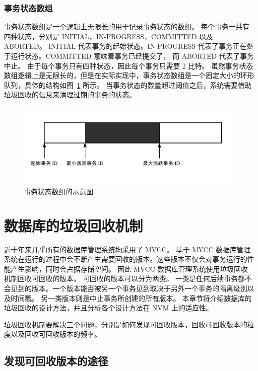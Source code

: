 \subsubsection{事务状态数组}

事务状态数组是一个逻辑上无限长的用于记录事务状态的数组。
每个事务一共有四种状态，分别是 INITIAL，IN-PROGRESS，COMMITTED 以及 ABORTED。
INITIAL 代表事务的起始状态。IN-PROGRESS 代表了事务正在处于运行状态。COMMITTED 意味着事务已经提交了，
而 ABORTED 代表了事务中止。
由于每个事务只有四种状态，因此每个事务只需要 2 比特。
虽然事务状态数组逻辑上是无限长的，但是在实际实现中，事务状态数组是一个固定大小的环形队列，具体的结构如图~\ref{fig:clog} 所示。
当事务状态的数量超过阈值之后，系统需要借助垃圾回收的信息来清理过期的事务的状态。

\begin{figure}
    \centering
    \includegraphics[width=1\linewidth]{figures/clog.pdf}
    \caption{事务状态数组的示意图}
    \label{fig:clog}
\end{figure}




\section{数据库的垃圾回收机制}

近十年来几乎所有的数据库管理系统均采用了 MVCC。
基于 MVCC 数据库管理系统在运行的过程中会不断产生需要回收的版本。这些版本不仅会对事务运行的性能产生影响，同时会占据存储空间。
因此 MVCC 数据库管理系统使用垃圾回收机制回收可回收的版本。
可回收的版本可以分为两类。
一类是任何后续事务都不会见到的版本。一个版本能否被另一个事务见到取决于另外一个事务的隔离级别以及时间戳。
另一类版本则是中止事务所创建的所有版本。
本章节将介绍数据库的垃圾回收的设计方法，并且分析各个设计方法在 NVM 上的适应性。

垃圾回收机制要解决三个问题，分别是如何发现可回收版本，回收可回收版本的粒度以及回收可回收版本的频率。

\subsection{发现可回收版本的途径}

